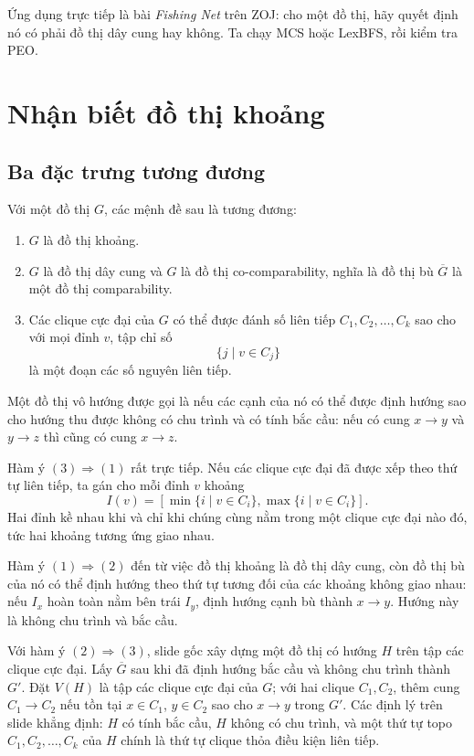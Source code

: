 \documentclass[11pt]{article}
\begin{document}
Ứng dụng trực tiếp là bài \textit{Fishing Net} trên ZOJ: cho một đồ thị, hãy
quyết định nó có phải đồ thị dây cung hay không. Ta chạy MCS hoặc LexBFS, rồi
kiểm tra PEO.

\section{Nhận biết đồ thị khoảng}

\subsection{Ba đặc trưng tương đương}

Với một đồ thị $G$, các mệnh đề sau là tương đương:
\begin{enumerate}
  \item $G$ là đồ thị khoảng.
  \item $G$ là đồ thị dây cung và $G$ là đồ thị co-comparability, nghĩa là đồ
  thị bù $\overline G$ là một đồ thị comparability.
  \item Các clique cực đại của $G$ có thể được đánh số liên tiếp
  $C_1,C_2,\ldots,C_k$ sao cho với mọi đỉnh $v$, tập chỉ số
  \[
    \{j\mid v\in C_j\}
  \]
  là một đoạn các số nguyên liên tiếp.
\end{enumerate}

Một đồ thị vô hướng được gọi là  nếu các cạnh của nó
có thể được định hướng sao cho hướng thu được không có chu trình và có tính
bắc cầu: nếu có cung $x\to y$ và $y\to z$ thì cũng có cung $x\to z$.

Hàm ý $(3)\Rightarrow(1)$ rất trực tiếp. Nếu các clique cực đại đã được xếp
theo thứ tự liên tiếp, ta gán cho mỗi đỉnh $v$ khoảng
\[
  I(v)=
  \left[
    \min\{i\mid v\in C_i\},
    \max\{i\mid v\in C_i\}
  \right].
\]
Hai đỉnh kề nhau khi và chỉ khi chúng cùng nằm trong một clique cực đại nào
đó, tức hai khoảng tương ứng giao nhau.

Hàm ý $(1)\Rightarrow(2)$ đến từ việc đồ thị khoảng là đồ thị dây cung, còn
đồ thị bù của nó có thể định hướng theo thứ tự tương đối của các khoảng không
giao nhau: nếu $I_x$ hoàn toàn nằm bên trái $I_y$, định hướng cạnh bù thành
$x\to y$. Hướng này là không chu trình và bắc cầu.

Với hàm ý $(2)\Rightarrow(3)$, slide gốc xây dựng một đồ thị có hướng $H$ trên
tập các clique cực đại. Lấy $\overline G$ sau khi đã định hướng bắc cầu và
không chu trình thành $G'$. Đặt $V(H)$ là tập các clique cực đại của $G$; với
hai clique $C_1,C_2$, thêm cung $C_1\to C_2$ nếu tồn tại $x\in C_1$,
$y\in C_2$ sao cho $x\to y$ trong $G'$. Các định lý trên slide khẳng định:
$H$ có tính bắc cầu, $H$ không có chu trình, và một thứ tự topo
$C_1,C_2,\ldots,C_k$ của $H$ chính là thứ tự clique thỏa điều kiện liên tiếp.
\end{document}
